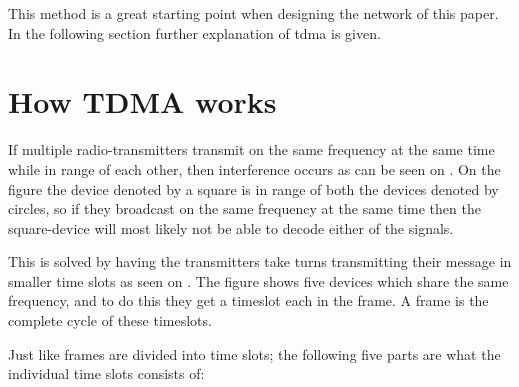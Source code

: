 This method is a great starting point when designing the network of this paper.
In the following section further explanation of \gls{tdma} is given.

\section{How TDMA works}

If multiple radio-transmitters transmit on the same frequency at the same time while in range of each other, then interference occurs as can be seen on . 
On the figure the device denoted by a square is in range of both the devices denoted by circles, so if they broadcast on the same frequency at the same time then the square-device will most likely not be able to decode either of the signals.\cite{networkencyclopedia2013time, networkencyclopedia2013advanced}



This is solved by having the transmitters take turns transmitting their message in smaller time slots as seen on .
The figure shows five devices which share the same frequency, and to do this they get a timeslot each in the frame.
A frame is the complete cycle of these timeslots.


\noindent
Just like frames are divided into time slots; the following five parts are what the individual time slots consists of:

